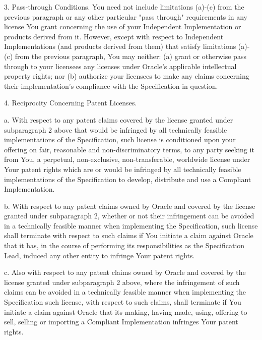 \begin{flushleft}
3. Pass-through Conditions. You need not include limitations (a)-(c) from the previous paragraph or any other particular "pass through" requirements in any license You grant concerning the use of your Independent Implementation or products derived from it.  However, except with respect to Independent Implementations (and products derived from them) that satisfy limitations (a)-(c) from the previous paragraph, You may neither:  (a) grant or otherwise pass through to your licensees any licenses under Oracle’s applicable intellectual property rights; nor (b) authorize your licensees to make any claims concerning their implementation's compliance with the Specification in question.

4. Reciprocity Concerning Patent Licenses.  

 \hspace{1em} a. With respect to any patent claims covered by the license granted under subparagraph 2 above that would be infringed by all technically feasible implementations of the Specification, such license is conditioned upon your offering on fair, reasonable and non-discriminatory terms, to any party seeking it from You, a perpetual, non-exclusive, non-transferable, worldwide license under Your patent rights which are or would be infringed by all technically feasible implementations of the Specification to develop, distribute and use a Compliant Implementation.

 \hspace{1em} b. With respect to any patent claims owned by Oracle and covered by the license granted under subparagraph 2, whether or not their infringement can be avoided in a technically feasible manner when implementing the Specification, such license shall terminate with respect to such claims if You initiate a claim against Oracle that it has, in the course of performing its responsibilities as the Specification Lead, induced any other entity to infringe Your patent rights.

 \hspace{1em} c. Also with respect to any patent claims owned by Oracle and covered by the license granted under subparagraph 2 above, where the infringement of such claims can be avoided in a technically feasible manner when implementing the Specification such license, with respect to such claims, shall terminate if You initiate a claim against Oracle  that its making, having made, using, offering to sell, selling or importing a Compliant Implementation infringes Your patent rights.


\end{flushleft}
